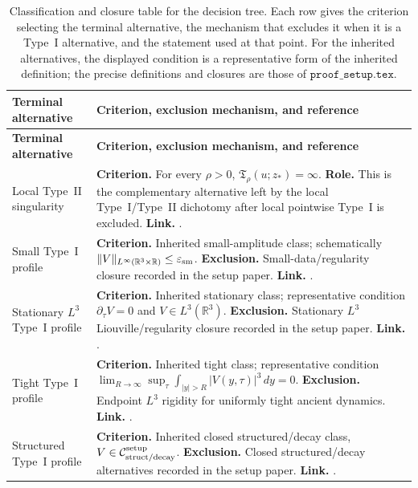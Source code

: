 \documentclass[11pt]{amsart}
\numberwithin{equation}{section}
\theoremstyle{plain}
\theoremstyle{definition}
\theoremstyle{remark}
\newcommand{\R}{\mathbb R}
\newcommand{\eps}{\varepsilon}
\begin{document}
\begingroup
\footnotesize
\setlength{\tabcolsep}{4pt}
\renewcommand{\arraystretch}{1.25}
\begin{longtable}{@{}L{1.20in}L{4.65in}@{}}
\caption{Classification and closure table for the decision tree.  Each row gives
the criterion selecting the terminal alternative, the mechanism that excludes
it when it is a Type~I alternative, and the statement used at that point.
For the inherited alternatives, the displayed condition is a representative
form of the inherited definition; the precise definitions and closures are those
of \(\texttt{proof\_setup.tex}\).}
\label{tab:decision-tree-classification}\\
\hline
\textbf{Terminal alternative} & \textbf{Criterion, exclusion mechanism, and reference}\\
\hline
\endfirsthead
\hline
\textbf{Terminal alternative} & \textbf{Criterion, exclusion mechanism, and reference}\\
\hline
\endhead
\hline
\endfoot
Local Type~II singularity &
\textbf{Criterion.}  For every \(\rho>0\),
\(\mathfrak T_\rho(u;z_*)=\infty\).
\textbf{Role.}  This is the complementary alternative left by the local
Type~I/Type~II dichotomy after local pointwise Type~I is excluded.
\textbf{Link.}  .\\

Small Type~I profile &
\textbf{Criterion.}  Inherited small-amplitude class; schematically
\(\|V\|_{L^\infty(\R^3\times\R)}\le\eps_{\rm sm}\).
\textbf{Exclusion.}  Small-data/regularity closure recorded in the setup
paper.
\textbf{Link.}  .\\

Stationary \(L^3\) Type~I profile &
\textbf{Criterion.}  Inherited stationary class; representative condition
\(\partial_\tau V=0\) and \(V\in L^3(\R^3)\).
\textbf{Exclusion.}  Stationary \(L^3\) Liouville/regularity closure recorded
in the setup paper.
\textbf{Link.}  .\\

Tight Type~I profile &
\textbf{Criterion.}  Inherited tight class; representative condition
\(\lim_{R\to\infty}\sup_\tau\int_{|y|>R}|V(y,\tau)|^3\,dy=0\).
\textbf{Exclusion.}  Endpoint \(L^3\) rigidity for uniformly tight ancient
dynamics.
\textbf{Link.}  .\\

Structured Type~I profile &
\textbf{Criterion.}  Inherited closed structured/decay class,
\(V\in\mathcal C_{\rm struct/decay}^{\rm setup}\).
\textbf{Exclusion.}  Closed structured/decay alternatives recorded in the
setup paper.
\textbf{Link.}  .\\


\end{longtable}
\end{document}
